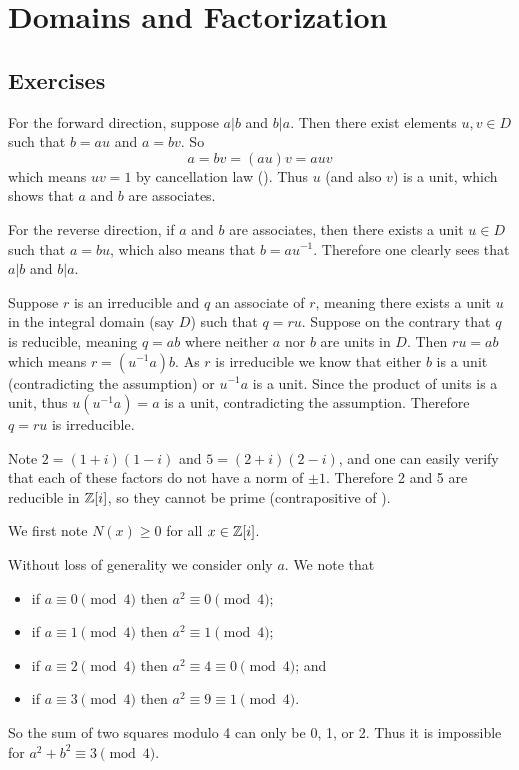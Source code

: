 \section{Domains and Factorization}
\subsection*{Exercises}
\begin{questions}
    \item For the forward direction, suppose $a \vert b$ and $b \vert a$. Then there exist elements $u, v \in D$ such that $b = au$ and $a = bv$. So
    \[
        a = bv = (au)v = auv
    \]
    which means $uv = 1$ by cancellation law (). Thus $u$ (and also $v$) is a unit, which shows that $a$ and $b$ are associates.

    For the reverse direction, if $a$ and $b$ are associates, then there exists a unit $u \in D$ such that $a = bu$, which also means that $b = au^{-1}$. Therefore one clearly sees that $a \vert b$ and $b \vert a$.

    \item Suppose $r$ is an irreducible and $q$ an associate of $r$, meaning there exists a unit $u$ in the integral domain (say $D$) such that $q = ru$. Suppose on the contrary that $q$ is reducible, meaning $q = ab$ where neither $a$ nor $b$ are units in $D$. Then $ru = ab$ which means $r = (u^{-1}a)b$. As $r$ is irreducible we know that either $b$ is a unit (contradicting the assumption) or $u^{-1}a$ is a unit. Since the product of units is a unit, thus $u(u^{-1}a) = a$ is a unit, contradicting the assumption. Therefore $q = ru$ is irreducible.

    \item \begin{partquestions}{\alph*}
        \item Note $2 = (1+i)(1-i)$ and $5 = (2+i)(2-i)$, and one can easily verify that each of these factors do not have a norm of $\pm1$. Therefore 2 and 5 are reducible in $\mathbb{Z}[i]$, so they cannot be prime (contrapositive of ).

        \item We first note $N(x) \geq 0$ for all $x \in \mathbb{Z}[i]$.
        \begin{partquestions}{\roman*}
            \item Without loss of generality we consider only $a$. We note that
            \begin{itemize}
                \item if $a \equiv 0 \pmod4$ then $a^2 \equiv 0 \pmod4$;
                \item if $a \equiv 1 \pmod4$ then $a^2 \equiv 1 \pmod4$;
                \item if $a \equiv 2 \pmod4$ then $a^2 \equiv 4 \equiv 0 \pmod4$; and
                \item if $a \equiv 3 \pmod4$ then $a^2 \equiv 9 \equiv 1 \pmod4$.
            \end{itemize}
            So the sum of two squares modulo 4 can only be 0, 1, or 2. Thus it is impossible for $a^2+b^2 \equiv 3\pmod4$.


\end{partquestions}
\end{partquestions}
\end{questions}
